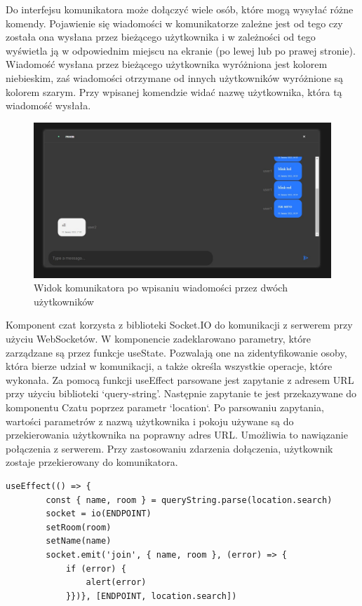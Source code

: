 Do interfejsu komunikatora może dołączyć wiele osób, które mogą wysyłać różne komendy. Pojawienie się wiadomości w komunikatorze zależne jest od tego czy została ona wysłana przez bieżącego użytkownika i w zależności od tego wyświetla ją w odpowiednim miejscu na ekranie (po lewej lub po prawej stronie). Wiadomość wysłana przez bieżącego użytkownika wyróżniona jest kolorem niebieskim, zaś wiadomości otrzymane od innych użytkowników wyróżnione są kolorem szarym. Przy wpisanej komendzie widać nazwę użytkownika, która tą wiadomość wysłała.
\begin{figure}
	\centering
	\includegraphics[width=0.5\linewidth]{"obrazy/interface2..2"}
	\caption{Widok komunikatora po wpisaniu wiadomości przez dwóch użytkowników}
	\label{fig:13}
\end{figure}
Komponent czat korzysta z biblioteki Socket.IO do komunikacji z serwerem przy użyciu WebSocketów. W komponencie zadeklarowano parametry, które zarządzane są przez funkcje useState. Pozwalają one na zidentyfikowanie osoby, która bierze udział w komunikacji, a także określa wszystkie operacje, które wykonała. Za pomocą funkcji useEffect parsowane jest zapytanie z adresem URL przy użyciu biblioteki ‘query-string’. Następnie zapytanie te jest przekazywane do komponentu Czatu poprzez parametr `location`. Po parsowaniu zapytania, wartości parametrów z nazwą użytkownika i pokoju używane są do przekierowania użytkownika na poprawny adres URL. Umożliwia to nawiązanie połączenia z serwerem. Przy zastosowaniu zdarzenia dołączenia, użytkownik zostaje przekierowany do komunikatora.
\begin{lstlisting}[caption=Implementacja funkcji dolaczenia do komunikatora po stronie klienta]
useEffect(() => {
        const { name, room } = queryString.parse(location.search)
        socket = io(ENDPOINT)
        setRoom(room)
        setName(name)
        socket.emit('join', { name, room }, (error) => {
            if (error) {
                alert(error)
            }})}, [ENDPOINT, location.search])
\end{lstlisting}

